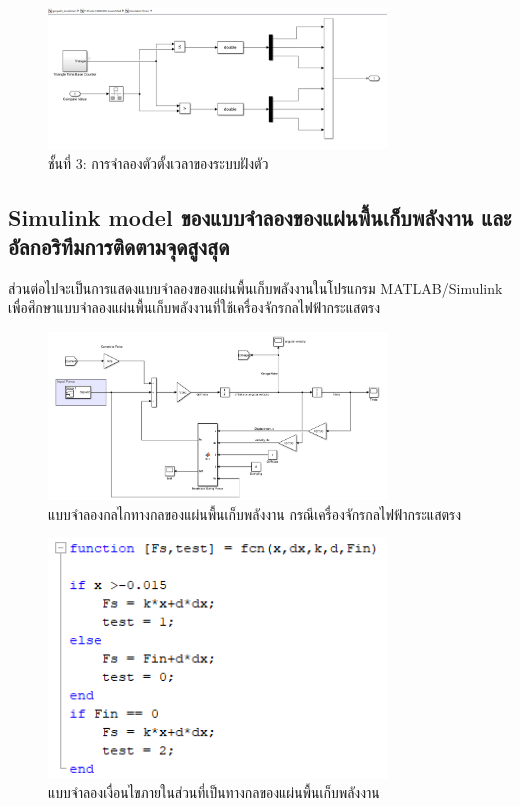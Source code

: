 \documentclass[11pt,a4paper]{article}
\begin{document}
\begin{figure}[H]
    \centering
    \includegraphics[width=0.8\textwidth]{l3-sim-tim.png}
    \caption{ชั้นที่ 3: การจำลองตัวตั้งเวลาของระบบฝังตัว}
\end{figure}

\subsection{Simulink model ของแบบจำลองของแผ่นพื้นเก็บพลังงาน และอัลกอริทึมการติดตามจุดสูงสุด}
ส่วนต่อไปจะเป็นการแสดงแบบจำลองของแผ่นพื้นเก็บพลังงานในโปรแกรม MATLAB/Simulink เพื่อศึกษาแบบจำลองแผ่นพื้นเก็บพลังงานที่ใช้เครื่องจักรกลไฟฟ้ากระแสตรง
\begin{figure}[H]
    \centering
    \includegraphics[width=0.8\textwidth]{mech_model_dc.png}
    \caption{แบบจำลองกลไกทางกลของแผ่นพื้นเก็บพลังงาน กรณีเครื่องจักรกลไฟฟ้ากระแสตรง}
\end{figure}
\begin{figure}[H]
    \centering
    \includegraphics[width=0.8\textwidth]{condition_mech.png}
    \caption{แบบจำลองเงื่อนไขภายในส่วนที่เป็นทางกลของแผ่นพื้นเก็บพลังงาน}
\end{figure}
\end{document}
